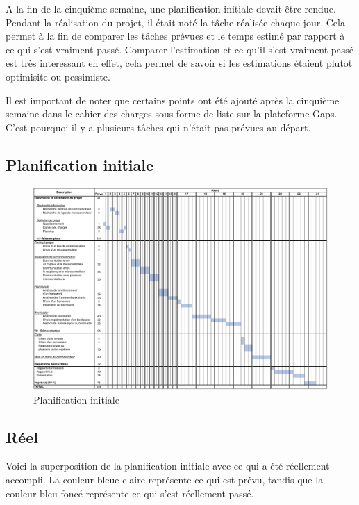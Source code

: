 A la fin de la cinquième semaine, une planification initiale devait être rendue. Pendant la réalisation du projet, il était noté la tâche réalisée chaque jour. Cela permet à la fin de comparer les tâches prévues et le temps estimé par rapport à ce qui s'est vraiment passé. Comparer l'estimation et ce qu'il s'est vraiment passé est très interessant en effet, cela permet de savoir si les estimations étaient plutot optimisite ou pessimiste.

Il est important de noter que certains points ont été ajouté après la cinquième semaine dans le cahier des charges sous forme de liste sur la plateforme Gaps. C'est pourquoi il y a plusieurs tâches qui n'était pas prévues au départ.

\newpage
\subsection{Planification initiale}

\begin{figure}[H]
    \centering
    \includegraphics[angle=90,origin=c,scale=0.55]{./assets/files/planning_initial.pdf}
    \caption{Planification initiale}
\end{figure}

\newpage
\subsection{Réel}

Voici la superposition de la planification initiale avec ce qui a été réellement accompli. La couleur bleue claire représente ce qui est prévu, tandis que la couleur bleu foncé représente ce qui s'est réellement passé.

